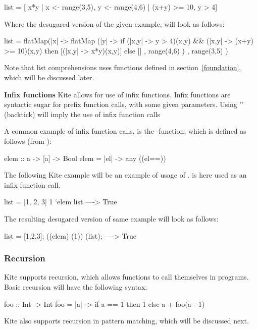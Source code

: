 \begin{kite}
list = [ x*y | x <- range(3,5), y <- range(4,6) | (x+y) >= 10, y > 4]
\end{kite}

Where the desugared version of the given example, will look as follows:

\begin{kite}
list =
flatMap(|x| -> {
  flatMap (|y| -> {
    if (|x,y| -> {y > 4})(x,y) && (|x,y| -> {(x+y) >= 10})(x,y)
       then [(|x,y| -> {x*y})(x,y)]
       else []
  } , range(4,6) )
}, range(3,5) )
\end{kite}

Note that list comprehensions uses functions defined in section~\ref{foundation}, which will be discussed later.

\textbf{Infix functions} Kite allows for use of infix functions. Infix functions are syntactic sugar for prefix function calls, with some given parameters. Using '\code{\`}' (backtick) will imply the use of infix function calls

A common example of infix function calls, is the -function, which is defined as follows (from ):
\begin{kite}
elem :: a -> [a] -> Bool
elem = |el| -> {
  any ((el==))
}
\end{kite}

The following Kite example will be an example of usage of .  is here used as an infix function call.
\begin{kite}
list = [1, 2, 3]
1 `elem list ----> True
\end{kite}
The resulting desugared version of same example will look as follows:

\begin{kite}
list = [1,2,3];
((elem) (1)) (list); ----> True
\end{kite}

\subsubsection{Recursion}
Kite supports recursion, which allows functions to call themselves in programs. Basic recursion will have the following syntax:
\begin{kite}
foo :: Int -> Int
foo = |a| -> {
  if a == 1 then 1
  else a + foo(a - 1)
}
\end{kite}

Kite also supports recursion in pattern matching, which will be discussed next.

